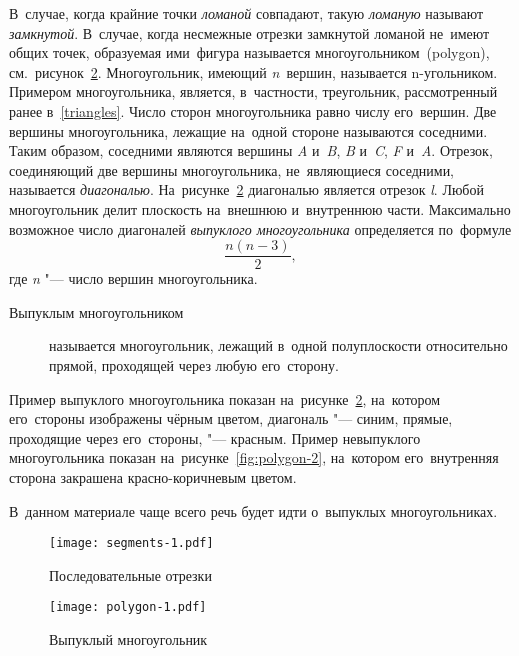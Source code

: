 \documentclass[]{scrartcl}
\begin{document}
В~случае, когда крайние точки \emph{ломаной} совпадают, такую \emph{ломаную} называют \emph{замкнутой}. В~случае, когда несмежные отрезки замкнутой ломаной не~имеют общих точек, образуемая ими~фигура называется многоугольником~(\foreignlanguage{english}{polygon}), см.~рисунок~\ref{fig:polygon-1}. Многоугольник, имеющий \textit{n}~вершин, называется n-угольником. Примером многоугольника, является, в~частности, треугольник, рассмотренный ранее в~\ref{triangles}. Число сторон многоугольника равно числу его~вершин. Две вершины многоугольника, лежащие на~одной стороне называются  соседними. Таким образом, соседними являются вершины \textit{A} и~\textit{B}, \textit{B} и~\textit{C}, \textit{F} и~\textit{A}. Отрезок, соединяющий две вершины многоугольника, не~являющиеся соседними, называется \emph{диагональю}. На~рисунке~\ref{fig:polygon-1} диагональю является отрезок \textit{l}. Любой многоугольник делит плоскость на~внешнюю и~внутреннюю части. Максимально возможное число диагоналей \emph{выпуклого многоугольника} определяется по~формуле
\begin{equation}\label{eq:n-polygon-vertex}
\frac{n(n-3)}{2},
\end{equation}
где \textit{n} "--- число вершин многоугольника.

\begin{description}
	\item[Выпуклым многоугольником] называется многоугольник, лежащий в~одной полуплоскости относительно прямой, проходящей через любую его~сторону.
\end{description}
Пример выпуклого многоугольника показан на~рисунке~\ref{fig:polygon-1}, на~котором его~стороны изображены чёрным цветом, диагональ "--- синим, прямые, проходящие через его~стороны, "--- красным.
Пример невыпуклого многоугольника показан на~рисунке~\ref{fig:polygon-2}, на~котором его~внутренняя сторона закрашена красно-коричневым цветом.

В~данном материале чаще всего речь будет идти о~выпуклых многоугольниках.
 
\begin{figure}[ht]
\centering %
\texttt{[image: segments-1.pdf]}
\caption{Последовательные отрезки}\label{fig:segments-1}
\end{figure}

\begin{figure}[ht]
\centering %
\texttt{[image: polygon-1.pdf]}
\caption{Выпуклый многоугольник}\label{fig:polygon-1}
\end{figure}  
\end{document}
